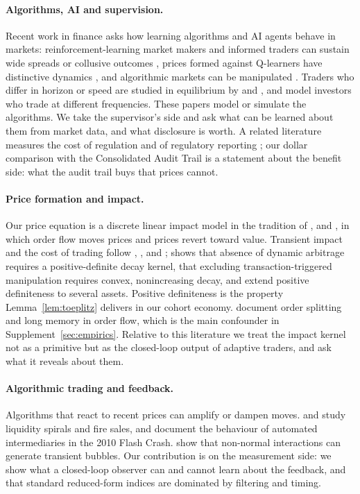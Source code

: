 \documentclass[12pt]{article}
\theoremstyle{definition}
\theoremstyle{remark}
\begin{document}
\paragraph{Algorithms, AI and supervision.} Recent work in finance asks how learning algorithms and AI agents behave in markets: reinforcement-learning market makers and informed traders can sustain wide spreads or collusive outcomes \citep{colliard2022,dou2025}, prices formed against Q-learners have distinctive dynamics \citep{banerjee2026}, and algorithmic markets can be manipulated \citep{tremacoldi2025}. Traders who differ in horizon or speed are studied in equilibrium by \citet{cespa2015} and \citet{biais2015}, and \citet{crouzet2020} model investors who trade at different frequencies. These papers model or simulate the algorithms. We take the supervisor's side and ask what can be learned about them from market data, and what disclosure is worth. A related literature measures the cost of regulation and of regulatory reporting \citep{trebbi2024}; our dollar comparison with the Consolidated Audit Trail is a statement about the benefit side: what the audit trail buys that prices cannot.

\paragraph{Price formation and impact.} Our price equation is a discrete linear impact model in the tradition of \citet{kyle1985}, \citet{glosten1985} and \citet{hasbrouck1991}, in which order flow moves prices and prices revert toward value. Transient impact and the cost of trading follow \citet{almgren2001}, \citet{obizhaeva2013}, \citet{gatheral2010} and \citet{bouchaud2004}; \citet{gatheral2010} shows that absence of dynamic arbitrage requires a positive-definite decay kernel, \citet{alfonsi2012} that excluding transaction-triggered manipulation requires convex, nonincreasing decay, and \citet{alfonsi2016} extend positive definiteness to several assets. Positive definiteness is the property Lemma~\ref{lem:toeplitz} delivers in our cohort economy. \citet{bouchaud2018} document order splitting and long memory in order flow, which is the main confounder in Supplement~\ref{sec:empirics}. Relative to this literature we treat the impact kernel not as a primitive but as the closed-loop output of adaptive traders, and ask what it reveals about them.

\paragraph{Algorithmic trading and feedback.} Algorithms that react to recent prices can amplify or dampen moves. \citet{brunnermeier2009} and \citet{shleifer1992} study liquidity spirals and fire sales, and \citet{kirilenko2017} document the behaviour of automated intermediaries in the 2010 Flash Crash. \citet{sornette2023} show that non-normal interactions can generate transient bubbles. Our contribution is on the measurement side: we show what a closed-loop observer can and cannot learn about the feedback, and that standard reduced-form indices are dominated by filtering and timing.
\end{document}
